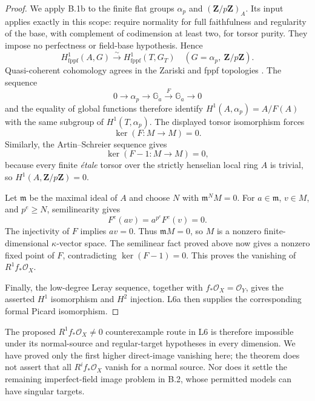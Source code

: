 \begin{proof}
We apply B.1b to the finite flat groups $\alpha_p$ and
$(\mathbf Z/p\mathbf Z)_A$.  Its input applies exactly in this
scope: \cite[Proposition 3, p.~432, and Theorem 6,
pp.~433--434]{Marrama2026} require normality for full faithfulness
and regularity of the base, with complement of codimension at
least two, for torsor purity.  They impose no perfectness or
field-base hypothesis.  Hence
\[
 H^1_{\mathrm{fppf}}(A,G)
       \xrightarrow{\ \sim\ } H^1_{\mathrm{fppf}}(T,G_T)
       \quad(G=\alpha_p,\ \mathbf Z/p\mathbf Z).
\]
Quasi-coherent cohomology agrees in the Zariski and fppf
topologies \cite[Proposition 35.9.3, Tag 03DW]{StacksB}.
The sequence
\[
 0\longrightarrow\alpha_p\longrightarrow\mathbb G_a
       \xrightarrow{F}\mathbb G_a\longrightarrow0
\]
and the equality of global functions therefore identify
$H^1(A,\alpha_p)=A/F(A)$ with the same subgroup of
$H^1(T,\alpha_p)$.  The displayed torsor isomorphism forces
\[
                         \ker(F:M\to M)=0.
\]
Similarly, the Artin--Schreier sequence gives
\[
                      \ker(F-1:M\to M)=0,
\]
because every finite \emph{\'etale} torsor over the strictly
henselian local ring $A$ is trivial, so $H^1(A,\mathbf Z/p\mathbf Z)=0$.

Let $\mathfrak m$ be the maximal ideal of $A$ and choose $N$
with $\mathfrak m^N M=0$.  For $a\in\mathfrak m$, $v\in M$,
and $p^e\ge N$, semilinearity gives
\[
                    F^e(av)=a^{p^e}F^e(v)=0.
\]
The injectivity of $F$ implies $av=0$.  Thus $\mathfrak mM=0$,
so $M$ is a nonzero finite-dimensional $\kappa$-vector space.
The semilinear fact proved above now gives a nonzero fixed
point of $F$, contradicting $\ker(F-1)=0$.  This proves the
vanishing of $R^1f_*\mathcal O_X$.

Finally, the low-degree Leray sequence, together with
$f_*\mathcal O_X=\mathcal O_Y$, gives the asserted
$H^1$ isomorphism and $H^2$ injection.  L6a then supplies
the corresponding formal Picard isomorphism.
\end{proof}

\begin{remark}
The proposed $R^1f_*\mathcal O_X\ne0$ counterexample route in
L6 is therefore impossible under its normal-source and
regular-target hypotheses in every dimension.  We have proved
only the first higher direct-image vanishing here; the theorem
does not assert that all $R^if_*\mathcal O_X$ vanish for a
normal source.  Nor does it settle the remaining imperfect-field
image problem in B.2, whose permitted models can have singular
targets.
\end{remark}
